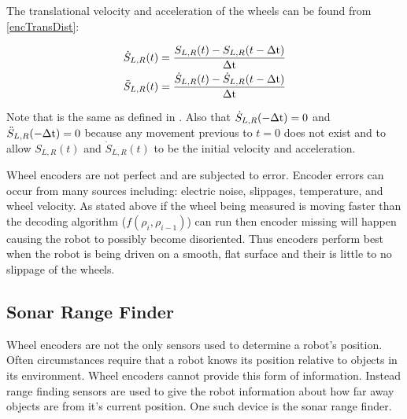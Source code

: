 \documentclass[main.tex]{subfiles}
\begin{document}
The translational velocity and acceleration of the wheels can be found from \eqref{encTransDist}:

\begin{eqnarray}
\label{eq:encTransSpeed}
\dot{S}_{L,R}(t) = \frac{S_{L,R}(t)-S_{L,R}(t-\Delta\mathrm{t})}{\Delta\mathrm{t}}
\\
\ddot{S}_{L,R}(t) = \frac{\dot{S}_{L,R}(t)-\dot{S}_{L,R}(t-\Delta\mathrm{t})}{\Delta\mathrm{t}}
\end{eqnarray}

Note that \delt is the same as defined in . Also that
$\dot{S}_{L,R}(-\Delta\mathrm{t}) = 0$ and $\ddot{S}_{L,R}(-\Delta\mathrm{t}) = 0$ because any
movement previous to $t=0$ does not exist and to allow $S_{L,R}(t)$ and
$\dot{S}_{L,R}(t)$ to be the initial velocity and acceleration.

Wheel encoders are not perfect and are subjected to error. Encoder errors can
occur from many sources including: electric noise, slippages, temperature, and
wheel velocity. As stated above if the wheel being measured is moving faster
than the decoding algorithm ($f(\rho_i,\rho_{i-1})$) can run then encoder
missing will happen causing the robot to possibly become disoriented. Thus
encoders perform best when the robot is being driven on a smooth, flat surface
and their is little to no slippage of the wheels. 

\subsection{Sonar Range Finder}
Wheel encoders are not the only sensors used to determine a robot's position.
Often circumstances require that a robot knows its position relative to objects
in its environment. Wheel encoders cannot provide this form of information.
Instead range finding sensors are used to give the robot information about how
far away objects are from it's current position. One such device is the sonar
range finder. 
\end{document}
